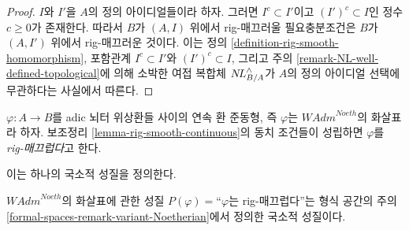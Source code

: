 \begin{proof}
$I$와 $I'$을 $A$의 정의 아이디얼들이라 하자.
그러면 $I^c \subset I'$이고 $(I')^c \subset I$인 정수 $c \geq 0$가 존재한다.
따라서 $B$가 $(A, I)$ 위에서 rig-매끄러울 필요충분조건은
$B$가 $(A, I')$ 위에서 rig-매끄러운 것이다. 이는 정의
\ref{definition-rig-smooth-homomorphism}, 포함관계
$I^c \subset I'$와 $(I')^c \subset I$, 그리고 주의
\ref{remark-NL-well-defined-topological}에 의해 소박한 여접 복합체
$\mathop{N\!L}\nolimits_{B/A}^\wedge$가 $A$의 정의 아이디얼 선택에 무관하다는 사실에서 따른다.
\end{proof}

\begin{definition}
\label{definition-rig-smooth-continuous-homomorphism}
$\varphi : A \to B$를 adic 뇌터 위상환들 사이의 연속 환 준동형,
즉 $\varphi$는 $\textit{WAdm}^{Noeth}$의 화살표라 하자. 보조정리
\ref{lemma-rig-smooth-continuous}의 동치 조건들이 성립하면
$\varphi$를 {\it rig-매끄럽다}고 한다.
\end{definition}

\noindent
이는 하나의 국소적 성질을 정의한다.

\begin{lemma}
\label{lemma-rig-smooth-axioms}
$\textit{WAdm}^{Noeth}$의 화살표에 관한 성질
$P(\varphi)=$``$\varphi$는 rig-매끄럽다''는 형식 공간의 주의
\ref{formal-spaces-remark-variant-Noetherian}에서 정의한 국소적 성질이다.
\end{lemma}

